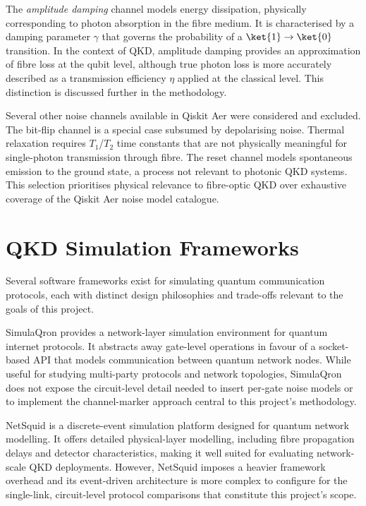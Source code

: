 The \textit{amplitude damping} channel models energy dissipation, physically corresponding to photon absorption in the fibre medium. It is characterised by a damping parameter $\gamma$ that governs the probability of a $\ket{1} \rightarrow \ket{0}$ transition. In the context of QKD, amplitude damping provides an approximation of fibre loss at the qubit level, although true photon loss is more accurately described as a transmission efficiency $\eta$ applied at the classical level. This distinction is discussed further in the methodology.

Several other noise channels available in Qiskit Aer were considered and excluded. The bit-flip channel is a special case subsumed by depolarising noise. Thermal relaxation requires $T_1$/$T_2$ time constants that are not physically meaningful for single-photon transmission through fibre. The reset channel models spontaneous emission to the ground state, a process not relevant to photonic QKD systems. This selection prioritises physical relevance to fibre-optic QKD over exhaustive coverage of the Qiskit Aer noise model catalogue.



\section{QKD Simulation Frameworks}

Several software frameworks exist for simulating quantum communication protocols, each with distinct design philosophies and trade-offs relevant to the goals of this project.

SimulaQron \cite{SimulaQron2018} provides a network-layer simulation environment for quantum internet protocols. It abstracts away gate-level operations in favour of a socket-based API that models communication between quantum network nodes. While useful for studying multi-party protocols and network topologies, SimulaQron does not expose the circuit-level detail needed to insert per-gate noise models or to implement the channel-marker approach central to this project's methodology.

NetSquid \cite{NetSquid2021} is a discrete-event simulation platform designed for quantum network modelling. It offers detailed physical-layer modelling, including fibre propagation delays and detector characteristics, making it well suited for evaluating network-scale QKD deployments. However, NetSquid imposes a heavier framework overhead and its event-driven architecture is more complex to configure for the single-link, circuit-level protocol comparisons that constitute this project's scope.

